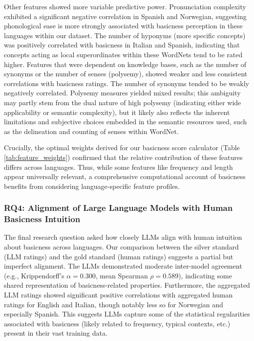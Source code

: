 \documentclass[preprint,12pt,authoryear]{elsarticle}
\begin{document}
Other features showed more variable predictive power. Pronunciation complexity exhibited a significant negative correlation in Spanish and Norwegian, suggesting phonological ease is more strongly associated with basicness perception in these languages within our dataset. The number of hyponyms (more specific concepts) was positively correlated with basicness in Italian and Spanish, indicating that concepts acting as local superordinates within these WordNets tend to be rated higher. Features that were dependent on knowledge bases, such as the number of synonyms or the number of senses (polysemy), showed weaker and less consistent correlations with basicness ratings. The number of synonyms tended to be weakly negatively correlated. Polysemy measures yielded mixed results; this ambiguity may partly stem from the dual nature of high polysemy (indicating either wide applicability or semantic complexity), but it likely also reflects the inherent limitations and subjective choices embedded in the semantic resources used, such as the delineation and counting of senses within WordNet.

Crucially, the optimal weights derived for our basicness score calculator (Table \ref{tab:feature_weights}) confirmed that the relative contribution of these features differs across languages. Thus, while some features like frequency and length appear universally relevant, a comprehensive computational account of basicness benefits from considering language-specific feature profiles.

\subsubsection{RQ4: Alignment of Large Language Models with Human Basicness Intuition}
The final research question asked how closely LLMs align with human intuition about basicness across languages. Our comparison between the silver standard (LLM ratings) and the gold standard (human ratings) suggests a partial but imperfect alignment. The LLMs demonstrated moderate inter-model agreement (e.g., Krippendorff's $\alpha = 0.300$, mean Spearman $\rho = 0.589$), indicating some shared representation of basicness-related properties. Furthermore, the aggregated LLM ratings showed significant positive correlations with aggregated human ratings for English and Italian, though notably less so for Norwegian and especially Spanish. This suggests LLMs capture some of the statistical regularities associated with basicness (likely related to frequency, typical contexts, etc.) present in their vast training data.
\end{document}
